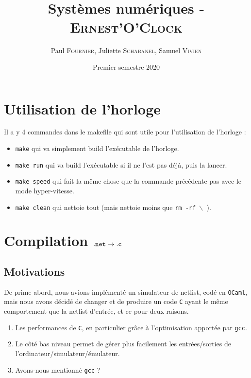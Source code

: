 \documentclass[10pt,a4paper,notitlepage ]{article}
\title{Systèmes numériques - \textsc{Ernest'O'Clock}}
\date{Premier semestre 2020}
\author{Paul \textsc{Fournier}, Juliette \textsc{Schabanel}, Samuel \textsc{Vivien}}
\begin{document}
	\maketitle
	\pagebreak
	\tableofcontents
	\pagebreak
	
	\section{Utilisation de l'horloge}

		Il a y 4 commandes dans le makefile qui sont utile pour l'utilisation de l'horloge :

		\begin{itemize}
			\item \texttt{make} qui va simplement build l'exécutable de l'horloge.
			\item \texttt{make run} qui va build l'exécutable si il ne l'est pas déjà, puis la lancer.
			\item \texttt{make speed} qui fait la même chose que la commande précédente pas avec le mode hyper-vitesse.
			\item \texttt{make clean} qui nettoie tout (mais nettoie moins que \texttt{rm -rf $\backslash$ }).
		\end{itemize}

	\section{Compilation $\tt{.net} \rightarrow \tt{.c}$}
	
	\subsection{Motivations}
	
	De prime abord, nous avions implémenté un simulateur de netlist, codé en \texttt{OCaml}, mais nous avons décidé de changer et de produire un code \texttt{C} ayant le même comportement que la netlist d'entrée, et ce pour deux raisons.
	\begin{enumerate}
		\item Les performances de \texttt{C}, en particulier grâce à l'optimisation apportée par \texttt{gcc}.
		\item Le côté bas niveau permet de gérer plus facilement les entrées/sorties de l'ordinateur/simulateur/émulateur.
		\item Avons-nous mentionné \texttt{gcc} ?
	\end{enumerate}
	
\end{document}
